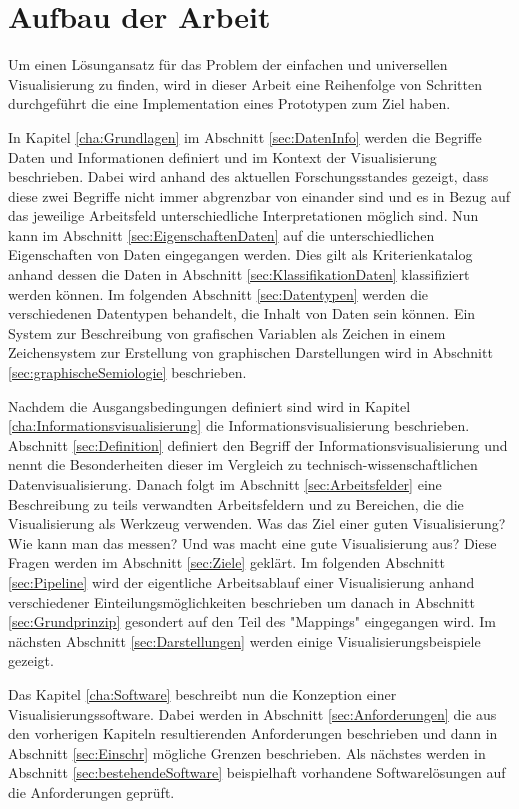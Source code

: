 \documentclass[a4paper, 12pt, DIVcalc, onepage, pdftex, headsepline, footsepline]{scrreprt}
\begin{document}
\section{Aufbau der Arbeit}
Um einen Lösungansatz für das Problem der einfachen und universellen Visualisierung zu finden, wird
in dieser Arbeit eine Reihenfolge von Schritten durchgeführt die eine Implementation eines
Prototypen zum Ziel haben.

In Kapitel \ref{cha:Grundlagen} im Abschnitt \ref{sec:DatenInfo} werden die Begriffe Daten und
Informationen definiert und im Kontext
der Visualisierung beschrieben. Dabei wird anhand des aktuellen Forschungsstandes gezeigt, dass diese
zwei Begriffe nicht immer abgrenzbar von einander sind und es in Bezug auf das jeweilige Arbeitsfeld
unterschiedliche Interpretationen möglich sind. Nun kann im Abschnitt \ref{sec:EigenschaftenDaten} auf die
unterschiedlichen Eigenschaften von Daten eingegangen werden. Dies gilt als Kriterienkatalog anhand
dessen die Daten in Abschnitt \ref{sec:KlassifikationDaten} klassifiziert werden können.
Im folgenden Abschnitt \ref{sec:Datentypen} werden die verschiedenen Datentypen behandelt, die Inhalt
von Daten sein können.
Ein System zur Beschreibung von grafischen Variablen als Zeichen in einem Zeichensystem zur Erstellung von
graphischen Darstellungen wird in Abschnitt \ref{sec:graphischeSemiologie} beschrieben.

Nachdem die Ausgangsbedingungen definiert sind wird in Kapitel \ref{cha:Informationsvisualisierung} die
Informationsvisualisierung beschrieben. Abschnitt \ref{sec:Definition} definiert den Begriff
der Informationsvisualisierung und nennt die Besonderheiten dieser im Vergleich zu technisch-wissenschaftlichen
Datenvisualisierung. Danach folgt im Abschnitt \ref{sec:Arbeitsfelder} eine Beschreibung zu teils verwandten
Arbeitsfeldern und zu Bereichen, die die Visualisierung als Werkzeug verwenden. Was das Ziel einer guten
Visualisierung? Wie kann man das messen? Und was macht eine gute Visualisierung aus? Diese Fragen werden
im Abschnitt \ref{sec:Ziele} geklärt. Im folgenden Abschnitt \ref{sec:Pipeline} wird der eigentliche Arbeitsablauf
einer Visualisierung anhand verschiedener Einteilungsmöglichkeiten beschrieben um danach in Abschnitt
\ref{sec:Grundprinzip} gesondert auf den Teil des "Mappings" eingegangen wird. Im nächsten Abschnitt
\ref{sec:Darstellungen} werden einige Visualisierungsbeispiele gezeigt.

Das Kapitel \ref{cha:Software} beschreibt nun die Konzeption einer Visualisierungssoftware.
Dabei werden in Abschnitt \ref{sec:Anforderungen} die aus den vorherigen Kapiteln resultierenden Anforderungen
beschrieben und dann in Abschnitt \ref{sec:Einschr} mögliche Grenzen beschrieben. Als nächstes
werden in Abschnitt \ref{sec:bestehendeSoftware} beispielhaft vorhandene Softwarelösungen auf die Anforderungen geprüft.
\end{document}
